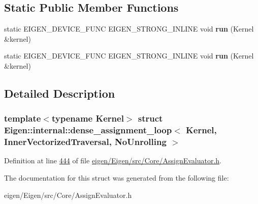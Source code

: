 \subsection*{Static Public Member Functions}
\begin{DoxyCompactItemize}
\item 
\mbox{\label{struct_eigen_1_1internal_1_1dense__assignment__loop_3_01_kernel_00_01_inner_vectorized_traversal_00_01_no_unrolling_01_4_a3f9af6ccbdafdfc7e2e8545c0683ca30}} 
static E\+I\+G\+E\+N\+\_\+\+D\+E\+V\+I\+C\+E\+\_\+\+F\+U\+NC E\+I\+G\+E\+N\+\_\+\+S\+T\+R\+O\+N\+G\+\_\+\+I\+N\+L\+I\+NE void {\bfseries run} (Kernel \&kernel)
\item 
\mbox{\label{struct_eigen_1_1internal_1_1dense__assignment__loop_3_01_kernel_00_01_inner_vectorized_traversal_00_01_no_unrolling_01_4_a3f9af6ccbdafdfc7e2e8545c0683ca30}} 
static E\+I\+G\+E\+N\+\_\+\+D\+E\+V\+I\+C\+E\+\_\+\+F\+U\+NC E\+I\+G\+E\+N\+\_\+\+S\+T\+R\+O\+N\+G\+\_\+\+I\+N\+L\+I\+NE void {\bfseries run} (Kernel \&kernel)
\end{DoxyCompactItemize}


\subsection{Detailed Description}
\subsubsection*{template$<$typename Kernel$>$\newline
struct Eigen\+::internal\+::dense\+\_\+assignment\+\_\+loop$<$ Kernel, Inner\+Vectorized\+Traversal, No\+Unrolling $>$}



Definition at line \hyperlink{eigen_2_eigen_2src_2_core_2_assign_evaluator_8h_source_l00444}{444} of file \hyperlink{eigen_2_eigen_2src_2_core_2_assign_evaluator_8h_source}{eigen/\+Eigen/src/\+Core/\+Assign\+Evaluator.\+h}.



The documentation for this struct was generated from the following file\+:\begin{DoxyCompactItemize}
\item 
eigen/\+Eigen/src/\+Core/\+Assign\+Evaluator.\+h\end{DoxyCompactItemize}
